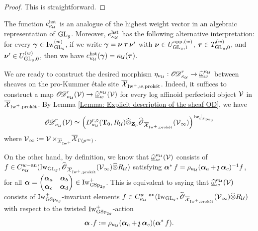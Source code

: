 \begin{proof}
This is straightforward.
\end{proof}

\begin{Remark}
\normalfont The function $e^{\hst}_{\kappa_{\calU}}$ is an analogue of the highest weight vector in an algebraic representation of $\GL_g$. Moreover, $e^{\hst}_{\kappa_{\calU}}$ has the following alternative interpretation: for every $\bfgamma\in \Iw^{(w)}_{\GL_g}$, if we write $\bfgamma=\bfnu\bftau\bfnu'$ with $\bfnu\in U^{\opp,(w)}_{\GL_g, 1}$, $\bftau\in T^{(w)}_{\GL_g, 0}$, and $\bfnu'\in U^{(w)}_{\GL_g, 0}$, then we have $e^{\hst}_{\kappa_{\calU}}(\bfgamma)=\kappa_{\calU}(\bftau)$.
\end{Remark}

We are ready to construct the desired morphism $\eta_{\kappa_{\calU}}:\sheafOD_{\kappa_{\calU}}^r\rightarrow\widehat{\underline{\omega}}_{w}^{\kappa_{\calU}}$ between sheaves on the pro-Kummer \'{e}tale site $\overline{\calX}_{\Iw^+, w, \proket}$. Indeed, it suffices to construct a map $\sheafOD_{\kappa_{\calU}}^r(\calV)\rightarrow \widehat{\underline{\omega}}_{w}^{\kappa_{\calU}}(\calV)$ for every log affinoid perfectoid object $\calV$ in $\overline{\calX}_{\Iw^+, \proket}$. By Lemma \ref{Lemma: Explicit description of the sheaf OD}, we have
$$\sheafOD_{\kappa_{\calU}}^r(\calV)\simeq\left(D_{\kappa_{\calU}}^{r, \circ}(\T_0, R_{\calU})\widehat{\otimes}_{\Z_p}\widehat{\scrO}_{\overline{\calX}_{\Iw^+, \proket}}(\calV_{\infty})\right)^{\Iw^+_{\GSp_{2g}}}$$
where $\calV_{\infty}:=\calV\times_{\overline{\calX}_{\Iw^+}}\overline{\calX}_{\Gamma(p^{\infty})}$. 

On the other hand, by definition, we know that $\widehat{\underline{\omega}}_{w}^{\kappa_{\calU}}(\calV)$ consists of $f\in C^{w-\an}_{\kappa_{\calU}}(\Iw_{\GL_g}, \widehat{\scrO}_{\overline{\calX}_{\Iw^+, \proket}}(\calV_{\infty})\widehat{\otimes}R_{\calU})$ satisfying $\bfalpha^*f=\rho_{\kappa_{\calU}}(\bfalpha_a+\frakz\bfalpha_c)^{-1}f$, for all $\bfalpha=\begin{pmatrix}\bfalpha_a & \bfalpha_b\\ \bfalpha_c & \bfalpha_d\end{pmatrix}\in \Iw_{\GSp_{2g}}^+$. This is equivalent to saying that $\widehat{\underline{\omega}}_{w}^{\kappa_{\calU}}(\calV)$ consists of $\Iw_{\GSp_{2g}}^+$-invariant elements $f\in C^{w-\an}_{\kappa_{\calU}}(\Iw_{\GL_g}, \widehat{\scrO}_{\overline{\calX}_{\Iw^+, \proket}}(\calV_{\infty})\widehat{\otimes}R_{\calU})$ with respect to the twisted $\Iw_{\GSp_{2g}}^+$-action 
$$\bfalpha.f:=\rho_{\kappa_{\calU}}(\bfalpha_a+\frakz\bfalpha_c)(\bfalpha^*f).$$

